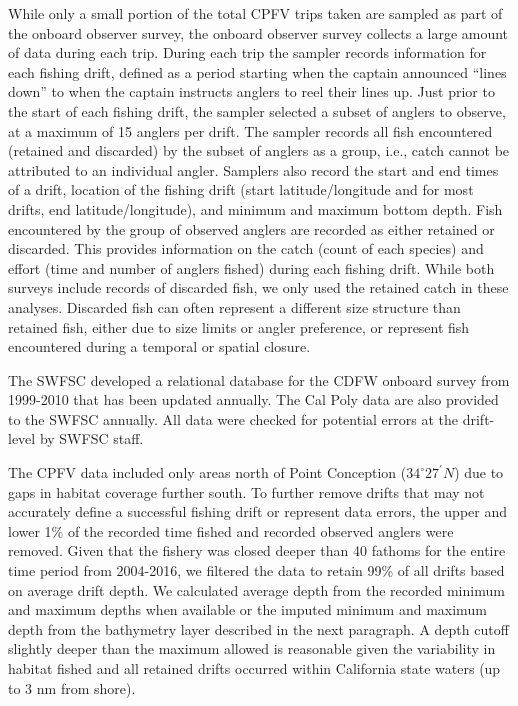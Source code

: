 \documentclass[
  12pt,
  authoryear,
  preprint,
  3p]{elsarticle}
\begin{document}
While only a small portion of the total CPFV trips taken are sampled as
part of the onboard observer survey, the onboard observer survey
collects a large amount of data during each trip. During each trip the
sampler records information for each fishing drift, defined as a period
starting when the captain announced ``lines down'' to when the captain
instructs anglers to reel their lines up. Just prior to the start of
each fishing drift, the sampler selected a subset of anglers to observe,
at a maximum of 15 anglers per drift. The sampler records all fish
encountered (retained and discarded) by the subset of anglers as a
group, i.e., catch cannot be attributed to an individual angler.
Samplers also record the start and end times of a drift, location of the
fishing drift (start latitude/longitude and for most drifts, end
latitude/longitude), and minimum and maximum bottom depth. Fish
encountered by the group of observed anglers are recorded as either
retained or discarded. This provides information on the catch (count of
each species) and effort (time and number of anglers fished) during each
fishing drift. While both surveys include records of discarded fish, we
only used the retained catch in these analyses. Discarded fish can often
represent a different size structure than retained fish, either due to
size limits or angler preference, or represent fish encountered during a
temporal or spatial closure.

The SWFSC developed a relational database for the CDFW onboard survey
from 1999-2010\citeyearpar{Monk:2014:DRD} that has been updated
annually. The Cal Poly data are also provided to the SWFSC annually. All
data were checked for potential errors at the drift-level by SWFSC
staff.

The CPFV data included only areas north of Point Conception
(\(34^\circ 27^\prime N\)) due to gaps in habitat coverage further
south. To further remove drifts that may not accurately define a
successful fishing drift or represent data errors, the upper and lower
1\% of the recorded time fished and recorded observed anglers were
removed. Given that the fishery was closed deeper than 40 fathoms for
the entire time period from 2004-2016, we filtered the data to retain
99\% of all drifts based on average drift depth. We calculated average
depth from the recorded minimum and maximum depths when available or the
imputed minimum and maximum depth from the bathymetry layer described in
the next paragraph. A depth cutoff slightly deeper than the maximum
allowed is reasonable given the variability in habitat fished and all
retained drifts occurred within California state waters (up to 3 nm from
shore).
\end{document}
